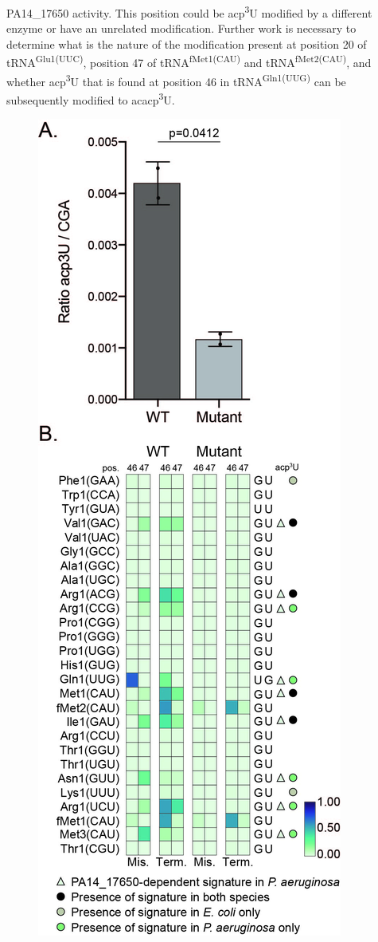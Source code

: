 \documentclass[times, twoside]{zHenriquesLab-StyleBioRxiv}
\begin{document}
PA14\_17650 activity. This position could be acp\textsuperscript{3}U modified by a different enzyme or have an unrelated modification. Further work is necessary to determine what is the nature of the modification present at position 20 of tRNA\textsuperscript{Gl}\textsuperscript{u}\textsuperscript{1(UU}\textsuperscript{C}\textsuperscript{)}, position 47 of tRNA\textsuperscript{fMet1(CAU)} and tRNA\textsuperscript{fMet2(CAU)}, and whether acp\textsuperscript{3}U that is found at position 46 in tRNA\textsuperscript{Gln1(UUG)} can be subsequently modified to acacp\textsuperscript{3}U. 
\begin{figure} [h]
    \centering
    \includegraphics[width=0.5\linewidth]{Figure5.jpg}

\end{figure}
\end{document}
